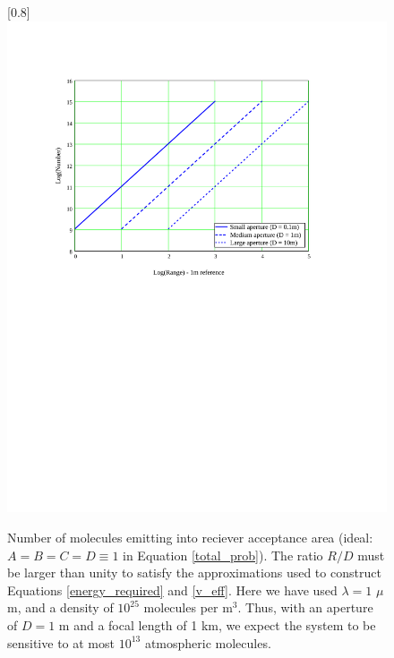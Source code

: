 \begin{figure}
\scalebox{0.8}[0.8]{
\includegraphics[bb=20 390 489 680]
{back_number/back_number.pdf}
}
\caption[Number of molecules emitting into reciever in a LIDAR application]{Number of molecules emitting into reciever acceptance area (ideal: $A=B=C=D\equiv1$ in Equation \ref{total_prob}). The ratio $R/D$ must be larger than unity to satisfy the approximations used to construct Equations \ref{energy_required} and \ref{v_eff}. Here we have used $\lambda=1$ $\mu$m, and a density of $10^{25}$ molecules per m$^3$. Thus, with an aperture of $D=1$ m and a focal length of 1 km, we expect the system to be sensitive to at most $10^{13}$ atmospheric molecules.}
\label{back_number}
\end{figure}
